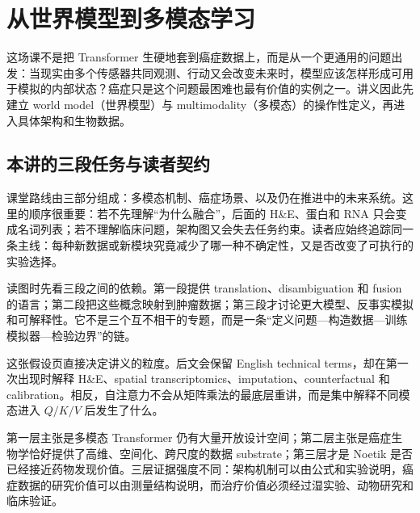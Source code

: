 \section{从世界模型到多模态学习}

这场课不是把 Transformer 生硬地套到癌症数据上，而是从一个更通用的问题出发：当现实由多个传感器共同观测、行动又会改变未来时，模型应该怎样形成可用于模拟的内部状态？癌症只是这个问题最困难也最有价值的实例之一。讲义因此先建立 world model（世界模型）与 multimodality（多模态）的操作性定义，再进入具体架构和生物数据。

\subsection{本讲的三段任务与读者契约}

课堂路线由三部分组成：多模态机制、癌症场景、以及仍在推进中的未来系统。这里的顺序很重要：若不先理解“为什么融合”，后面的 H\&E、蛋白和 RNA 只会变成名词列表；若不理解临床问题，架构图又会失去任务约束。读者应始终追踪同一条主线：每种新数据或新模块究竟减少了哪一种不确定性，又是否改变了可执行的实验选择。


读图时先看三段之间的依赖。第一段提供 translation、disambiguation 和 fusion 的语言；第二段把这些概念映射到肿瘤数据；第三段才讨论更大模型、反事实模拟和可解释性。它不是三个互不相干的专题，而是一条“定义问题—构造数据—训练模拟器—检验边界”的链。


这张假设页直接决定讲义的粒度。后文会保留 English technical terms，却在第一次出现时解释 H\&E、spatial transcriptomics、imputation、counterfactual 和 calibration。相反，自注意力不会从矩阵乘法的最底层重讲，而是集中解释不同模态进入 $Q/K/V$ 后发生了什么。


第一层主张是多模态 Transformer 仍有大量开放设计空间；第二层主张是癌症生物学恰好提供了高维、空间化、跨尺度的数据 substrate；第三层才是 Noetik 是否已经接近药物发现价值。三层证据强度不同：架构机制可以由公式和实验说明，癌症数据的研究价值可以由测量结构说明，而治疗价值必须经过湿实验、动物研究和临床验证。


